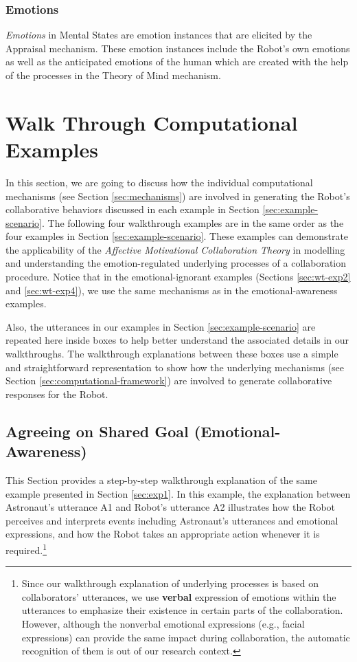 \subsubsection{Emotions}

\textit{Emotions} in Mental States are emotion instances that are elicited by
the Appraisal mechanism. These emotion instances include the Robot's own
emotions as well as the anticipated emotions of the human which are created with
the help of the processes in the Theory of Mind mechanism.

\section{Walk Through Computational Examples}
\label{sec:wtce}

In this section, we are going to discuss how the individual computational
mechanisms (see Section \ref{sec:mechanisms}) are involved in generating the
Robot's collaborative behaviors discussed in each example in Section
\ref{sec:example-scenario}. The following four walkthrough examples are in the
same order as the four examples in Section \ref{sec:example-scenario}. These
examples can demonstrate the applicability of the \textit{Affective Motivational
Collaboration Theory} in modelling and understanding the emotion-regulated
underlying processes of a collaboration procedure. Notice that in the
emotional-ignorant examples (Sections \ref{sec:wt-exp2} and \ref{sec:wt-exp4}),
we use the same mechanisms as in the emotional-awareness examples.

Also, the utterances in our examples in Section \ref{sec:example-scenario} are
repeated here inside boxes to help better understand the associated details in
our walkthroughs. The walkthrough explanations between these boxes use a simple
and straightforward representation to show how the underlying mechanisms (see
Section \ref{sec:computational-framework}) are involved to generate
collaborative responses for the Robot.

\subsection{Agreeing on Shared Goal (Emotional-Awareness)}
\label{sec:wt-exp1}

This Section provides a step-by-step walkthrough explanation of the same
example presented in Section \ref{sec:exp1}. In this example, the explanation
between Astronaut's utterance A1 and Robot's utterance A2 illustrates how the
Robot perceives and interprets events including Astronaut's utterances and
emotional expressions, and how the Robot takes an appropriate action whenever it
is required.\footnote{Since our walkthrough explanation of underlying processes
is based on collaborators' utterances, we use \textbf{verbal} expression of
emotions within the utterances to emphasize their existence in certain parts of
the collaboration. However, although the nonverbal emotional expressions (e.g.,
facial expressions) can provide the same impact during collaboration, the
automatic recognition of them is out of our research context.}\\

